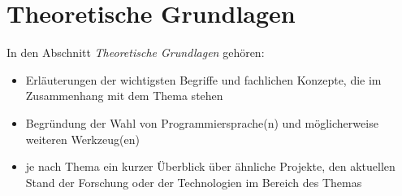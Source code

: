 \chapter{Theoretische Grundlagen}
In den Abschnitt \emph{Theoretische Grundlagen} gehören:

\begin{itemize}
\item Erläuterungen der wichtigsten Begriffe und fachlichen Konzepte, die im Zusammenhang mit dem Thema stehen
\item Begründung der Wahl von Programmiersprache(n) und möglicherweise weiteren Werkzeug(en)
\item je nach Thema ein kurzer Überblick über ähnliche Projekte, den aktuellen Stand der Forschung oder der Technologien im Bereich des Themas
\end{itemize}